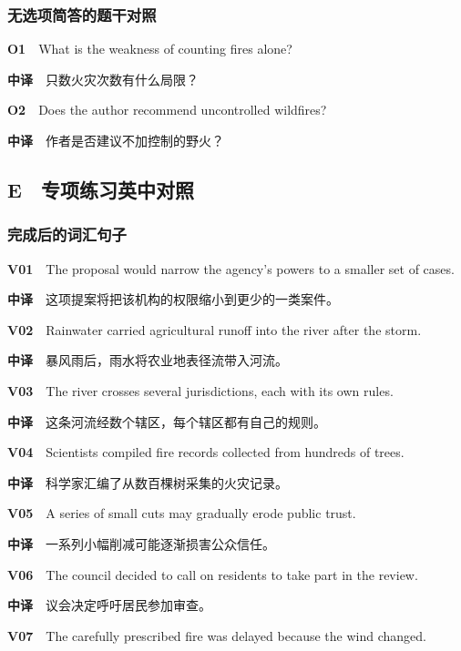\documentclass[
  11pt,
]{ctexart}
\begin{document}
\subsubsection{无选项简答的题干对照}\label{ux65e0ux9009ux9879ux7b80ux7b54ux7684ux9898ux5e72ux5bf9ux7167-1}

\textbf{O1}　What is the weakness of counting fires alone?

\textbf{中译}　只数火灾次数有什么局限？

\textbf{O2}　Does the author recommend uncontrolled wildfires?

\textbf{中译}　作者是否建议不加控制的野火？

\subsection{E　专项练习英中对照}\label{e-ux4e13ux9879ux7ec3ux4e60ux82f1ux4e2dux5bf9ux7167}

\subsubsection{完成后的词汇句子}\label{ux5b8cux6210ux540eux7684ux8bcdux6c47ux53e5ux5b50}

\textbf{V01}　The proposal would narrow the agency's powers to a smaller
set of cases.

\textbf{中译}　这项提案将把该机构的权限缩小到更少的一类案件。

\textbf{V02}　Rainwater carried agricultural runoff into the river after
the storm.

\textbf{中译}　暴风雨后，雨水将农业地表径流带入河流。

\textbf{V03}　The river crosses several jurisdictions, each with its own
rules.

\textbf{中译}　这条河流经数个辖区，每个辖区都有自己的规则。

\textbf{V04}　Scientists compiled fire records collected from hundreds
of trees.

\textbf{中译}　科学家汇编了从数百棵树采集的火灾记录。

\textbf{V05}　A series of small cuts may gradually erode public trust.

\textbf{中译}　一系列小幅削减可能逐渐损害公众信任。

\textbf{V06}　The council decided to call on residents to take part in
the review.

\textbf{中译}　议会决定呼吁居民参加审查。

\textbf{V07}　The carefully prescribed fire was delayed because the wind
changed.
\end{document}
